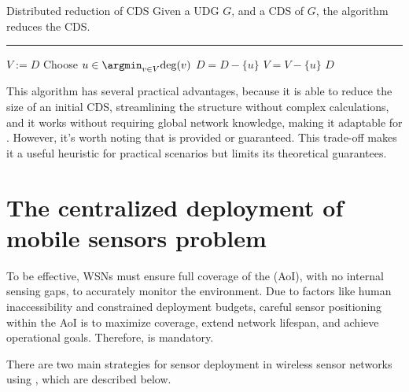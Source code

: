 \documentclass[a4paper, 12pt]{report}
\begin{document}
    \begin{framedalgo}{Distributed reduction of CDS}
        Given a UDG $G$, and a CDS of $G$, the algorithm reduces the CDS. \\
        \hrule

        \quad
        \label{alg:distributed_reduce_CDS}
        \begin{algorithmic}[1]
                \State $V := D$
                \Do
                    \State Choose $u \in \argmin_{v \in V}{\deg(v)}$
                     
                        \State $D = D - \{u\}$
                    \EndIf
                    \State $V = V - \{u\}$
                \State {} $D$
            \EndFunction
        \end{algorithmic}
    \end{framedalgo}

    This algorithm has several practical advantages, because it is able to reduce the size of an initial CDS, streamlining the structure without complex calculations, and it works without requiring global network knowledge, making it adaptable for . However, it's worth noting that  is provided or guaranteed. This trade-off makes it a useful heuristic for practical scenarios but limits its theoretical guarantees.

    \chapter{The centralized deployment of mobile sensors problem}

    To be effective, WSNs must ensure full coverage of the  (AoI), with no internal sensing gaps, to accurately monitor the environment. Due to factors like human inaccessibility and constrained deployment budgets, careful sensor positioning within the AoI is  to maximize coverage, extend network lifespan, and achieve operational goals. Therefore,  is mandatory.

    There are two main strategies for sensor deployment in wireless sensor networks using , which are described below.
\end{document}
